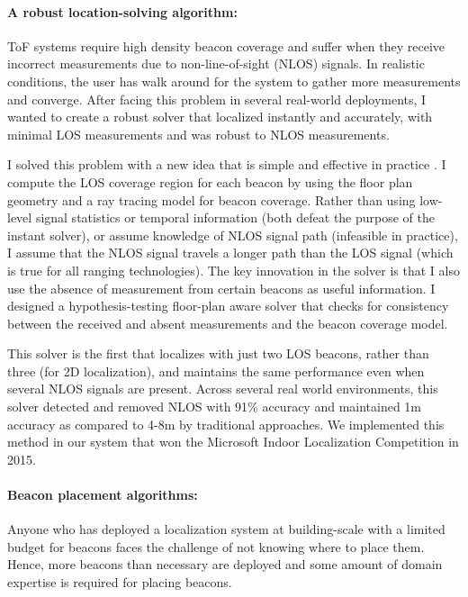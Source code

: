 \documentclass[10pt]{article}
\begin{document}
\paragraph{A robust location-solving algorithm: }
ToF systems require high density beacon coverage and suffer when they receive incorrect measurements due to
non-line-of-sight (NLOS) signals. 
In realistic conditions, the user has walk around for the system to gather more measurements and converge. After facing this problem in several real-world deployments, I wanted to create a robust solver that localized instantly and accurately, with minimal LOS measurements and was robust to NLOS measurements. 

I solved this problem with a new idea that is simple and effective in practice \cite{rajagopal2018enhancing}. 
I compute the LOS coverage region for each beacon by using the floor plan geometry and a ray tracing model for beacon coverage. Rather than using low-level signal statistics or temporal information (both defeat the purpose of the instant solver), or assume knowledge of NLOS signal path (infeasible in practice), I assume that the NLOS signal travels a longer path than the LOS signal (which is true for all ranging technologies). The key innovation in the solver is that I also use the absence of measurement from certain beacons as useful information. I designed a hypothesis-testing floor-plan aware solver that checks for consistency between the received and absent measurements and the beacon coverage model.

This solver is the first that localizes with just two LOS beacons, rather than three (for 2D localization), and maintains the same performance even when several NLOS signals are present. Across several real
world environments, this solver detected and removed NLOS with 91\% accuracy and maintained 1m accuracy as compared to 4-8m by traditional approaches. We implemented this
method in our system that won the Microsoft Indoor
Localization Competition in 2015. 

\paragraph{Beacon placement algorithms: }
Anyone who has deployed a localization system at building-scale with a limited budget for beacons faces the challenge of not knowing where to place them. %
Hence, more beacons than necessary are deployed and some amount of domain expertise is required for placing beacons. 
\end{document}
